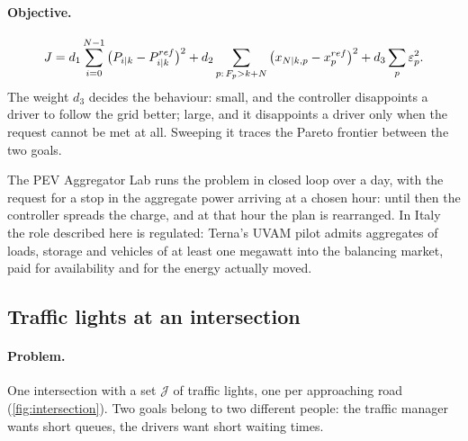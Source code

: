 \paragraph{Objective.}
\begin{equation}
  J = d_1 \sum_{i=0}^{N-1}\big(P_{{i|k}} - P^{ref}_{{i|k}}\big)^2
    + d_2 \sum_{p:\,F_p > k+N}\big(x_{{N|k},p} - x^{ref}_p\big)^2
    + d_3 \sum_{p} \varepsilon_p^2 .
\end{equation}
The weight $d_3$ decides the behaviour: small, and the controller disappoints a driver to follow
the grid better; large, and it disappoints a driver only when the request cannot be met at all.
Sweeping it traces the Pareto frontier between the two goals.

\begin{labbox}
The PEV Aggregator Lab runs the problem in closed loop over a day, with the request for a stop
in the aggregate power arriving at a chosen hour: until then the controller spreads the charge,
and at that hour the plan is rearranged. In Italy the role described here is regulated: Terna's
UVAM pilot admits aggregates of loads, storage and vehicles of at least one megawatt into the
balancing market, paid for availability and for the energy actually moved.
\end{labbox}

\subsection{Traffic lights at an intersection}
\label{sec:traffic}

\paragraph{Problem.} One intersection with a set $\mathcal{J}$ of traffic lights, one per
approaching road (\cref{fig:intersection}). Two goals belong to two different people: the
traffic manager wants short queues, the drivers want short waiting times.

